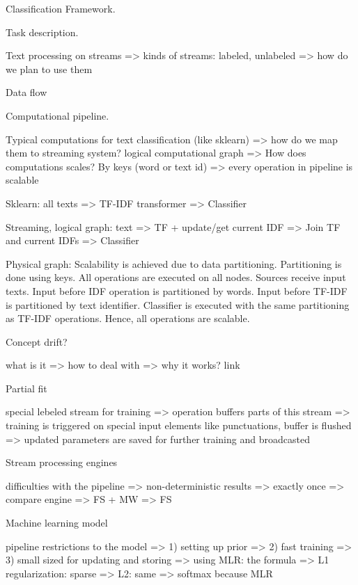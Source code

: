 
Classification Framework.

Task description. 

Text processing on streams => kinds of streams: labeled, unlabeled => how do we plan to use them

Data flow 

Computational pipeline.

Typical computations for text classification (like sklearn) => how do we map them to streaming system? logical computational graph => How does computations scales? By keys (word or text id) => every operation in pipeline is scalable

Sklearn: all texts => TF-IDF transformer => Classifier

Streaming, logical graph: text => TF + update/get current IDF => Join TF and current IDFs => Classifier

Physical graph: Scalability is achieved due to data partitioning. Partitioning is done using keys. All operations are executed on all nodes. Sources receive input texts. Input before IDF operation is partitioned by words. Input before TF-IDF is partitioned by text identifier. Classifier is executed with the same partitioning as TF-IDF operations. Hence, all operations are scalable. 

Concept drift?

what is it => how to deal with => why it works? link

Partial fit

special lebeled stream for training => operation buffers parts of this stream => training is triggered on special input elements like punctuations, buffer is flushed => updated parameters are saved for further training and broadcasted

Stream processing engines

difficulties with the pipeline => non-deterministic results => exactly once => compare engine => FS + MW => FS 

Machine learning model

pipeline restrictions to the model => 1) setting up prior => 2) fast training => 3) small sized for updating and storing => using MLR: the formula => L1 regularization: sparse => L2: same => softmax because MLR
